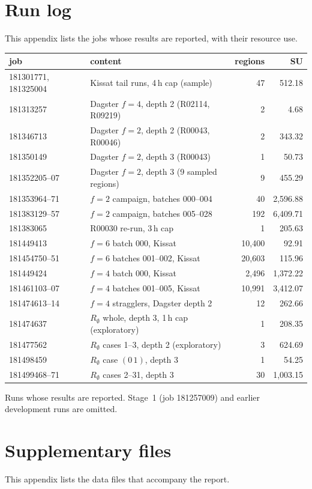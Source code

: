 \documentclass[11pt,a4paper]{article}
\theoremstyle{definition}
\begin{document}
\section{Run log}
This appendix lists the jobs whose results are reported, with their resource use.

\begin{longtable}{@{}lp{7.2cm}rr@{}}
\toprule
job & content & regions & SU \\
\midrule
181301771, 181325004 & Kissat tail runs, 4\,h cap (sample) & 47 & 512.18 \\
181313257 & Dagster $f=4$, depth 2 (R02114, R09219) & 2 & 4.68 \\
181346713 & Dagster $f=2$, depth 2 (R00043, R00046) & 2 & 343.32 \\
181350149 & Dagster $f=2$, depth 3 (R00043) & 1 & 50.73 \\
181352205--07 & Dagster $f=2$, depth 3 (9 sampled regions) & 9 & 455.29 \\
181353964--71 & $f=2$ campaign, batches 000--004 & 40 & 2{,}596.88 \\
181383129--57 & $f=2$ campaign, batches 005--028 & 192 & 6{,}409.71 \\
181383065 & R00030 re-run, 3\,h cap & 1 & 205.63 \\
181449413 & $f=6$ batch 000, Kissat & 10{,}400 & 92.91 \\
181454750--51 & $f=6$ batches 001--002, Kissat & 20{,}603 & 115.96 \\
181449424 & $f=4$ batch 000, Kissat & 2{,}496 & 1{,}372.22 \\
181461103--07 & $f=4$ batches 001--005, Kissat & 10{,}991 & 3{,}412.07 \\
181474613--14 & $f=4$ stragglers, Dagster depth 2 & 12 & 262.66 \\
181474637 & $R_\emptyset$ whole, depth 3, 1\,h cap (exploratory) & 1 & 208.35 \\
181477562 & $R_\emptyset$ cases 1--3, depth 2 (exploratory) & 3 & 624.69 \\
181498459 & $R_\emptyset$ case $(0\,1)$, depth 3 & 1 & 54.25 \\
181499468--71 & $R_\emptyset$ cases 2--31, depth 3 & 30 & 1{,}003.15 \\
\bottomrule
\end{longtable}
\noindent Runs whose results are reported. Stage~1 (job 181257009) and earlier development runs
are omitted.

\section{Supplementary files}
This appendix lists the data files that accompany the report.
\end{document}
